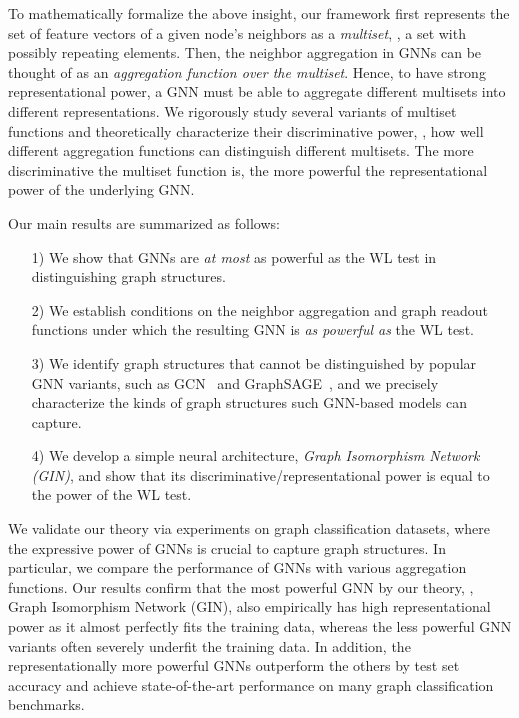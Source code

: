 To mathematically formalize the above insight, our framework first represents the 
set of feature vectors of a given node's neighbors as a \emph{multiset}, \ie, a set with possibly repeating elements. Then, the neighbor aggregation in GNNs can be thought of as an \emph{aggregation function over the multiset}. Hence, to have strong representational power, a GNN must be able to aggregate different multisets into different representations.
We rigorously study several variants of multiset functions and theoretically characterize their discriminative power, \ie, %
how well different aggregation functions can distinguish different multisets. The more discriminative the multiset function is, the more powerful the representational power of the underlying GNN. 

Our main results are summarized as follows: \vspace{-5pt}
\begin{itemize}[leftmargin=1cm]
	\item[1)] We show that GNNs are \textit{at most} as powerful as the WL test in distinguishing %
        graph structures.  
	\item[2)] We establish conditions on the neighbor aggregation and graph readout functions under which the resulting GNN is \textit{as powerful as} the WL test. 
	\item[3)] We identify graph structures that cannot be distinguished by popular GNN variants, such as GCN~\citep{kipf2016semi} and GraphSAGE~\citep{hamilton2017inductive}, and we precisely characterize the kinds of graph structures such GNN-based models can capture.
	\item[4)] We develop a simple neural architecture, {\em Graph Isomorphism Network (GIN)}, and show
	that its discriminative/representational power is equal to the power of the WL test.
\end{itemize}
%
We validate our theory via %
experiments on graph classification datasets, where the expressive power of GNNs is crucial to capture graph structures. In particular, we compare the performance of GNNs with various aggregation functions. Our results confirm that the most powerful GNN by our theory, \ie, Graph Isomorphism Network (GIN), also empirically has high representational power as it almost perfectly fits the training data, whereas the less powerful GNN variants often severely underfit the training data. In addition, the representationally more powerful GNNs outperform the others by test set accuracy and achieve state-of-the-art performance on many graph classification benchmarks.



